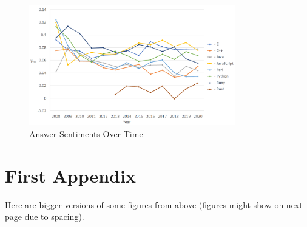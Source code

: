\documentclass[conference]{IEEEtran}
\begin{document}
\begin{figure}[htbp]
\centering
\includegraphics[width=0.8\textwidth]{figures/time_answers_em.png}
\caption{Answer Sentiments Over Time}
\label{fig}
\end{figure}

\appendices
\section{First Appendix}
Here are bigger versions of some figures from above (figures might show on next page due to spacing).
\end{document}
